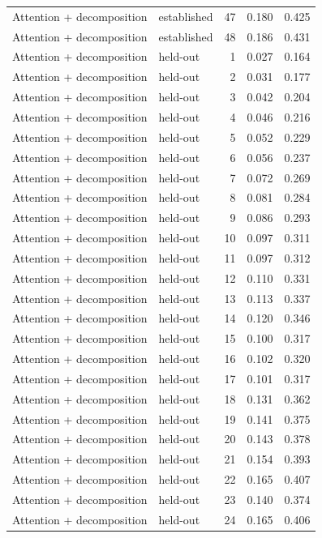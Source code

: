 \begin{tabular}{llrrr}
Attention + decomposition & established & 47 & 0.180 & 0.425 \\
Attention + decomposition & established & 48 & 0.186 & 0.431 \\
Attention + decomposition & held-out & 1 & 0.027 & 0.164 \\
Attention + decomposition & held-out & 2 & 0.031 & 0.177 \\
Attention + decomposition & held-out & 3 & 0.042 & 0.204 \\
Attention + decomposition & held-out & 4 & 0.046 & 0.216 \\
Attention + decomposition & held-out & 5 & 0.052 & 0.229 \\
Attention + decomposition & held-out & 6 & 0.056 & 0.237 \\
Attention + decomposition & held-out & 7 & 0.072 & 0.269 \\
Attention + decomposition & held-out & 8 & 0.081 & 0.284 \\
Attention + decomposition & held-out & 9 & 0.086 & 0.293 \\
Attention + decomposition & held-out & 10 & 0.097 & 0.311 \\
Attention + decomposition & held-out & 11 & 0.097 & 0.312 \\
Attention + decomposition & held-out & 12 & 0.110 & 0.331 \\
Attention + decomposition & held-out & 13 & 0.113 & 0.337 \\
Attention + decomposition & held-out & 14 & 0.120 & 0.346 \\
Attention + decomposition & held-out & 15 & 0.100 & 0.317 \\
Attention + decomposition & held-out & 16 & 0.102 & 0.320 \\
Attention + decomposition & held-out & 17 & 0.101 & 0.317 \\
Attention + decomposition & held-out & 18 & 0.131 & 0.362 \\
Attention + decomposition & held-out & 19 & 0.141 & 0.375 \\
Attention + decomposition & held-out & 20 & 0.143 & 0.378 \\
Attention + decomposition & held-out & 21 & 0.154 & 0.393 \\
Attention + decomposition & held-out & 22 & 0.165 & 0.407 \\
Attention + decomposition & held-out & 23 & 0.140 & 0.374 \\
Attention + decomposition & held-out & 24 & 0.165 & 0.406 \\

\end{tabular}
